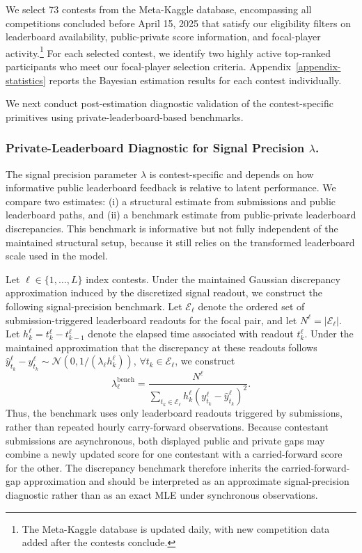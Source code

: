 \documentclass[mnsc]{informs3}
\begin{document}
We select 73 contests from the Meta-Kaggle database, encompassing all competitions concluded before April 15, 2025 that satisfy our eligibility filters on leaderboard availability, public-private score information, and focal-player activity.\footnote{
The Meta-Kaggle database is updated daily, with new competition data added after the contests conclude.
}
For each selected contest, we identify two highly active top-ranked participants who meet our focal-player selection criteria.
Appendix~\ref{appendix-statistics} reports the Bayesian estimation results for each contest individually.

We next conduct post-estimation diagnostic validation of the contest-specific primitives using private-leaderboard-based benchmarks.

\subsubsection{Private-Leaderboard Diagnostic for Signal Precision $\lambda$.}
The signal precision parameter $\lambda$ is contest-specific and depends on how informative public leaderboard feedback is relative to latent performance.
We compare two estimates: (i) a structural estimate from submissions and public leaderboard paths, and (ii) a benchmark estimate from public-private leaderboard discrepancies.
This benchmark is informative but not fully independent of the maintained structural setup, because it still relies on the transformed leaderboard scale used in the model.

Let $\ell\in\{1,\ldots,L\}$ index contests.
Under the maintained Gaussian discrepancy approximation induced by the discretized signal readout, we construct the following signal-precision benchmark.
Let $\mathcal E_\ell$ denote the ordered set of submission-triggered leaderboard readouts for the focal pair, and let $N^\ell=|\mathcal E_\ell|$.
Let $h_k^\ell=t_k^\ell-t_{k-1}^\ell$ denote the elapsed time associated with readout $t_k^\ell$.
Under the maintained approximation that the discrepancy at these readouts follows $\hat{y}_{t_k}^\ell-y_{t_k}^\ell\sim\mathcal N(0,1/(\lambda_\ell h_k^\ell))$, $\forall t_k\in\mathcal E_\ell$, we construct
\begin{equation*}
\lambda^{\text{bench}}_\ell =
\frac{N^\ell}
{\sum_{t_k\in\mathcal E_\ell}
h_k^\ell (y_{t_k}^\ell - \hat{y}_{t_k}^\ell)^2}.
\end{equation*}
Thus, the benchmark uses only leaderboard readouts triggered by submissions, rather than repeated hourly carry-forward observations.
Because contestant submissions are asynchronous, both displayed public and private gaps may combine a newly updated score for one contestant with a carried-forward score for the other. The discrepancy benchmark therefore inherits the carried-forward-gap approximation and should be interpreted as an approximate signal-precision diagnostic rather than as an exact MLE under synchronous observations.
\end{document}
